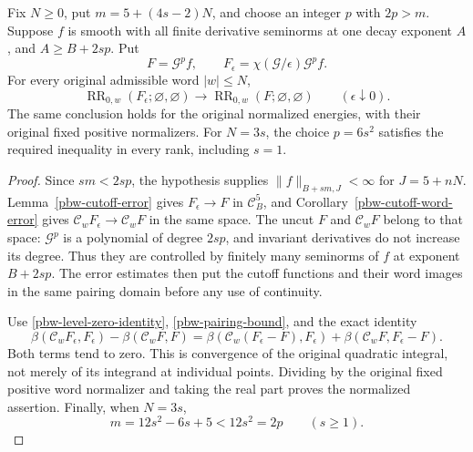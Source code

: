 \begin{theorem}
\label{pbw-level-zero-cutoff}
Fix $N\ge0$, put $m=5+(4s-2)N$, and choose an integer $p$ with
$2p>m$.  Suppose $f$ is smooth with all finite derivative
seminorms at one decay exponent $A$, and
$A\ge B+2sp$.  Put
\[
 F=\mathcal G^pf,\qquad
 F_\epsilon=\chi(\mathcal G/\epsilon)\mathcal G^pf.
\]
For every original admissible word $|w|\le N$,
\begin{equation}\label{pbw-level-zero-limit}
 \operatorname{RR}_{0,w}(F_\epsilon;\varnothing,\varnothing)
 \longrightarrow
 \operatorname{RR}_{0,w}(F;\varnothing,\varnothing)
                    \qquad(\epsilon\downarrow0).
\end{equation}
The same conclusion holds for the original normalized energies,
with their original fixed positive normalizers.
For $N=3s$, the choice $p=6s^2$ satisfies the required inequality
in every rank, including $s=1$.
\end{theorem}

\begin{proof}
Since $sm<2sp$, the hypothesis supplies
$\|f\|_{B+sm,J}<\infty$ for $J=5+nN$.
Lemma~\ref{pbw-cutoff-error} gives $F_\epsilon\to F$ in
$\mathcal C_B^5$, and Corollary~\ref{pbw-cutoff-word-error}
gives $\mathcal C_wF_\epsilon\to\mathcal C_wF$ in the same
space.  The uncut $F$ and $\mathcal C_wF$ belong to that space:
$\mathcal G^p$ is a polynomial of degree $2sp$, and invariant
derivatives do not increase its degree.  Thus they are controlled
by finitely many seminorms of $f$ at exponent $B+2sp$.
The error estimates then put the cutoff functions and their word
images in the same pairing domain before any use of continuity.

Use \eqref{pbw-level-zero-identity},
\eqref{pbw-pairing-bound}, and the exact identity
\[
 \beta(\mathcal C_wF_\epsilon,F_\epsilon)
       -\beta(\mathcal C_wF,F)
 =\beta(\mathcal C_w(F_\epsilon-F),F_\epsilon)
       +\beta(\mathcal C_wF,F_\epsilon-F).
\]
Both terms tend to zero.  This is convergence of the original
quadratic integral, not merely of its integrand at individual
points.  Dividing by the original fixed positive word normalizer
and taking the real part proves the normalized assertion.
Finally, when $N=3s$,
\[
 m=12s^2-6s+5<12s^2=2p\qquad(s\ge1).
\]
\end{proof}

